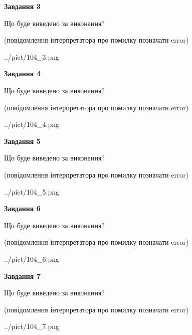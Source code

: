 \documentclass[12pt, ukrainian]{article}
\begin{document}
{\begin {large}
{\begin {center}\textbf{Завдання 3}\end {center}}\par
Що буде виведено за виконання?\par
 (повідомлення інтерпретатора про помилку позначати error)\par
\begin{center}
	{../pict/104_3.png}
\end{center}
\newpage

{\begin {center}\textbf{Завдання 4}\end {center}}\par
Що буде виведено за виконання?\par
 (повідомлення інтерпретатора про помилку позначати error)\par
\begin{center}
	{../pict/104_4.png}
\end{center}
\newpage

{\begin {center}\textbf{Завдання 5}\end {center}}\par
Що буде виведено за виконання?\par
 (повідомлення інтерпретатора про помилку позначати error)\par
\begin{center}
	{../pict/104_5.png}
\end{center}
\newpage

{\begin {center}\textbf{Завдання 6}\end {center}}\par
Що буде виведено за виконання?\par
 (повідомлення інтерпретатора про помилку позначати error)\par
\begin{center}
	{../pict/104_6.png}
\end{center}
\newpage

{\begin {center}\textbf{Завдання 7}\end {center}}\par
Що буде виведено за виконання?\par
 (повідомлення інтерпретатора про помилку позначати error)\par
\begin{center}
	{../pict/104_7.png}
\end{center}
\newpage


\end{large}}
\end{document}
